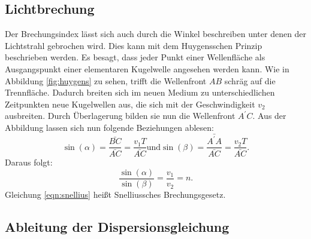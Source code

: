 \subsection{Lichtbrechung}


Der Brechungsindex lässt sich auch durch die Winkel beschreiben unter denen der Lichtstrahl
gebrochen wird. Dies kann mit dem Huygensschen Prinzip beschrieben werden. Es besagt, dass
jeder Punkt einer Wellenfläche als Ausgangspunkt einer elementaren Kugelwelle angesehen werden kann.
Wie in Abbildung \ref{fig:huygens} zu sehen, trifft die Wellenfront $AB$ schräg auf die Trennfläche.
Dadurch breiten sich im neuen Medium zu unterschiedlichen Zeitpunkten neue Kugelwellen aus, die sich
mit der Geschwindigkeit $v_2$ ausbreiten. Durch Überlagerung bilden sie nun
die Wellenfront $A^{'} C$. Aus der Abbildung lassen sich nun folgende Beziehungen ablesen:
\begin{equation*}
  \sin(\alpha) = \frac{\bar{B C}}{\bar{A C}} = \frac{v_1 T}{\bar{AC}} \text{und}
  \sin(\beta) = \frac{\bar{A^{'}A}}{\bar{A C}} = \frac{v_2 T}{\bar{A C}}.
\end{equation*}
Daraus folgt:
\begin{equation}
  \frac{\sin(\alpha)}{\sin(\beta)} = \frac{v_1}{v_2} = n.
  \label{eqn:snellius}
\end{equation}
Gleichung \eqref{eqn:snellius} heißt Snelliussches Brechungsgesetz.

\subsection{Ableitung der Dispersionsgleichung}

